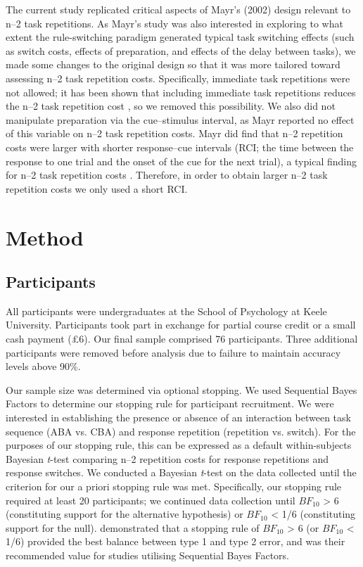 \documentclass[a4paper, doc, natbib]{apa6}
\begin{document}
The current study replicated critical aspects of Mayr's (2002) design relevant to n--2 task repetitions. As Mayr's study was also interested in exploring to what extent the rule-switching paradigm generated typical task switching effects (such as switch costs, effects of preparation, and effects of the delay between tasks), we made some changes to the original design so that it was more tailored toward assessing n--2 task repetition costs. Specifically, immediate task repetitions were not allowed; it has been shown that including immediate task repetitions reduces the n--2 task repetition cost \citep{Philipp2006}, so we removed this possibility. We also did not manipulate preparation via the cue--stimulus interval, as Mayr reported no effect of this variable on n--2 task repetition costs. Mayr did find that n--2 repetition costs were larger with shorter response--cue intervals (RCI; the time between the response to one trial and the onset of the cue for the next trial), a typical finding for n--2 task repetition costs \citep{Gade2005, Grange2009, Mayr2000}. Therefore, in order to obtain larger n--2 task repetition costs we only used a short RCI. 

\section{Method}

\subsection{Participants}
All participants were undergraduates at the School of Psychology at Keele University. Participants took part in exchange for partial course credit or a small cash payment (£6). Our final sample comprised 76 participants. Three additional participants were removed before analysis due to failure to maintain accuracy levels above 90\%.

Our sample size was determined via optional stopping. We used Sequential Bayes Factors \citep{Schoenbrodtinpress} to determine our stopping rule for participant recruitment. We were interested in establishing the presence or absence of an interaction between task sequence (ABA vs. CBA) and response repetition (repetition vs. switch). For the purposes of our stopping rule, this can be expressed as a default within-subjects Bayesian \emph{t}-test \citep{Rouder2009} comparing n--2 repetition costs for response repetitions and response switches.  We conducted a Bayesian \emph{t}-test on the data collected until the criterion for our a priori stopping rule was met. Specifically, our stopping rule required at least 20 participants; we continued data collection until $BF_{10}$ > 6 (constituting support for the alternative hypothesis) or $BF_{10}$ < 1/6 (constituting support for the null). \cite{Schoenbrodtinpress} demonstrated that a stopping rule of $BF_{10}$ > 6 (or $BF_{10}$ < 1/6) provided the best balance between type 1 and type 2 error, and was their recommended value for studies utilising Sequential Bayes Factors. 
\end{document}
